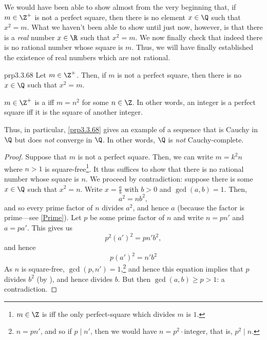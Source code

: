 We would have been able to show almost from the very beginning that, if $m\in \Z ^+$ is not a perfect square, then there is no element $x\in \Q$ such that $x^2=m$.  What we haven't been able to show until just now, however, is that there is a \emph{real} number $x\in \R$ such that $x^2=m$.  We now finally check that indeed there is no rational number whose square is $m$.  Thus, we will have finally established the existence of real numbers which are not rational.
\begin{prp}{}{prp3.3.68}
Let $m\in \Z ^+$.  Then, if $m$ is not a perfect square, then there is no $x\in \Q$ such that $x^2=m$.
\begin{rmk}
$m\in \Z ^+$ is a  iff $m=n^2$ for some $n\in \Z$.  In other words, an integer is a perfect square iff it is the square of another integer.
\end{rmk}
\begin{rmk}
Thus, in particular, \cref{prp3.3.68} gives an example of a sequence that is Cauchy in $\Q$ but does \emph{not} converge in $\Q$.  In other words, $\Q$ is \emph{not} Cauchy-complete.
\end{rmk}
\begin{proof}
Suppose that $m$ is not a perfect square.  Then, we can write $m=k^2n$ where $n>1$ is square-free\footnote{$m\in \Z$ is  iff the only perfect-square which divides $m$ is $1$.}.  It thus suffices to show that there is no rational number whose square is $n$.  We proceed by contradiction:  suppose there is some $x\in \Q$ such that $x^2=n$.  Write $x=\frac{a}{b}$ with $b>0$ and $\gcd (a,b)=1$.  Then,
\begin{equation}
a^2=nb^2,
\end{equation}
and so every prime factor of $n$ divides $a^2$, and hence $a$ (because the factor is prime---see \cref{Prime}).  Let $p$ be some prime factor of $n$ and write $n=pn'$ and $a=pa'$.  This gives us
\begin{equation}
p^2(a')^2=pn'b^2,
\end{equation}
and hence
\begin{equation}
p(a')^2=n'b^2
\end{equation}
As $n$ is square-free, $\gcd (p,n')=1$,\footnote{$n=pn'$, and so if $p\mid n'$, then we would have $n=p^2\cdot \text{integer}$, that is, $p^2\mid n$.} and hence this equation implies that $p$ divides $b^2$ (by ), and hence divides $b$.  But then $\gcd (a,b)\geq p>1$:  a contradiction.
\end{proof}
\end{prp}

